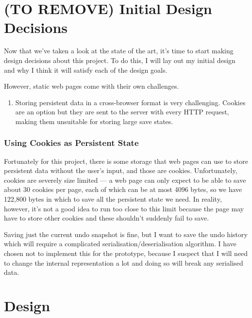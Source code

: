 \documentclass[12pt]{article}
\newcommand{\br}[0]{\vspace{10pt} \noindent}
\begin{document}
\pagebreak

\section{(TO REMOVE) Initial Design Decisions}

Now that we've taken a look at the state of the art, it's time to start making design decisions
about this project.  To do this, I will lay out my initial design and why I think it will satisfy
each of the design goals.

\br{}However, static web pages come with their own challenges.

\begin{enumerate}
    \item Storing persistent data in a cross-browser format is very challenging.  Cookies are an
        option but they are sent to the server with every HTTP request, making them unsuitable for
        storing large save states.
\end{enumerate}

\subsubsection{Using Cookies as Persistent State}

Fortunately for this project, there is some storage that web pages can use to store persistent data
without the user's input, and those are cookies.  Unfortunately, cookies are severely size limited
--- a web page can only expect to be able to save about 30 cookies per page, each of which can be at
most 4096 bytes, so we have 122,800 bytes in which to save all the persistent state we need.  In
reality, however, it's not a good idea to run too close to this limit because the page may have to
store other cookies and these shouldn't suddenly fail to save.

Saving just the current undo snapshot is fine, but I want to save the undo history which will
require a complicated serialisation/deserialisation algorithm.  I have chosen not to implement this
for the prototype, because I suspect that I will need to change the internal representation a lot
and doing so will break any serialised data.



\pagebreak

\section{Design}
\end{document}

